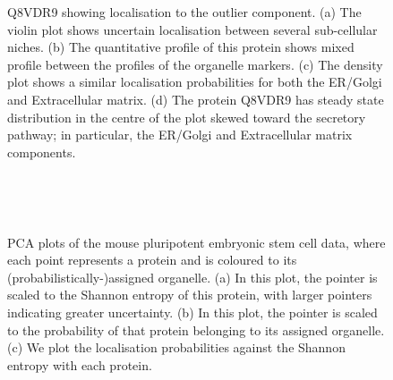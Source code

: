 \documentclass[10pt,letterpaper]{article}\usepackage[]{graphicx}\usepackage[]{color}
\begin{document}
\begin{figure}[!p]
  \centering
  \begin{subfigure}[t]{0.5\textwidth}
    \centering

  \end{subfigure}%
  \begin{subfigure}[t]{0.5\textwidth}
    \centering

  \end{subfigure}
  \vspace{1cm}
  \begin{subfigure}[t]{0.5\textwidth}
    \centering

  \end{subfigure}%
  \begin{subfigure}[t]{0.5\textwidth}
    \centering

  \end{subfigure}

  \caption{Q8VDR9 showing localisation to the outlier component.  (a)
    The violin plot shows uncertain localisation between several
    sub-cellular niches. (b) The quantitative profile of this protein
    shows mixed profile between the profiles of the organelle
    markers. (c) The density plot shows a similar localisation
    probabilities for both the ER/Golgi and Extracellular matrix. (d)
    The protein Q8VDR9 has steady state distribution in the centre of
    the plot skewed toward the secretory pathway; in particular, the
    ER/Golgi and Extracellular matrix components.}
  \label{fig:Q8VDR9}
\end{figure}

\begin{figure}[!p]
  \centering
  \begin{subfigure}[t]{0.5\textwidth}
    \centering

  \end{subfigure}%
~
  \begin{subfigure}[t]{0.5\textwidth}
    \centering

  \end{subfigure}%
\\
  \begin{subfigure}[t]{0.5\textwidth}
    \centering

  \end{subfigure}

  \caption{PCA plots of the mouse pluripotent embryonic stem cell data, where
    each point represents a protein and is coloured
    to its (probabilistically-)assigned organelle. (a) In this plot, the pointer is
    scaled to the Shannon entropy of this protein, with
    larger pointers indicating greater uncertainty.
    (b) In this plot, the pointer is scaled to the probability
    of that protein belonging to its assigned organelle. (c) We plot
    the localisation probabilities against the Shannon entropy
    with each protein.}
  \label{figure:proteomeuncertainty}
 \end{figure}
\end{document}
